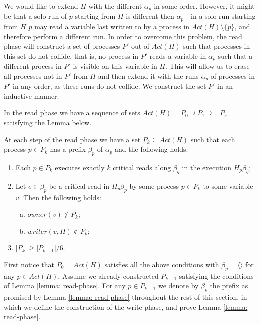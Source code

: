We would like to extend $H$ with the different $\alpha_p$ in some order. However, it might be that a solo run of $p$ starting from $H$ is different then $\alpha_p$ - in a solo run starting from $H$ $p$ may read a variable last written to by a process in $Act(H) \setminus \{p\}$, and therefore perform a different run. In order to overcome this problem, the read phase will construct a set of processes $P'$ out of $Act(H)$ such that processes in this set do not collide, that is, no process in $P'$ reads a variable in $\alpha_p$ such that a different process in $P'$ is visible on this variable in $H$. This will allow us to erase all processes not in $P'$ from $H$ and then extend it with the runs $\alpha_p$ of processes in $P'$ in any order, as these runs do not collide. We construct the set $P'$ in an inductive manner.

In the read phase we have a sequence of sets $Act(H) = P_0 \supseteq P_1 \supseteq \ldots P_s$ satisfying the Lemma below.

\begin{lemma} \label{lemma: read-phase}
	At each step of the read phase we have a set $P_k \subseteq Act(H)$ such that each process $p \in P_k$ has a prefix $\beta_p$ of $\alpha_p$ and the following holds:
	\begin{enumerate} [(1)]
		\item Each $p \in P_k$ executes exactly $k$ critical reads along $\beta_q$ in the execution $H_p \beta_q$;
		\item Let $e \in \beta_p$ be a critical read in $H_p \beta_p$ by some process $p \in P_k$ to some variable $v$. Then the following holds:
		\begin{enumerate}[(a)]
			\item $owner(v) \notin P_k$;
			\item $writer(v,H) \notin P_k$;
		\end{enumerate}
	\item $|P_k| \geq |P_{k-1}|/6$.
	\end{enumerate}
\end{lemma}

First notice that $P_0=Act(H)$ satisfies all the above conditions with $\beta_p=\langle \rangle$ for any $p \in Act(H)$. Assume we already constructed $P_{k-1}$ satisfying the conditions of Lemma \ref{lemma: read-phase}. For any $p \in P_{k-1}$ we denote by $\beta_p$ the prefix as promised by Lemma \ref{lemma: read-phase} throughout the rest of this section, in which we define the construction of the write phase, and prove Lemma \ref{lemma: read-phase}.


